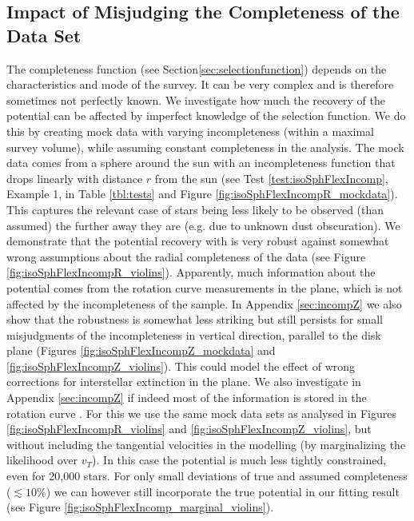 \subsection{Impact of Misjudging the Completeness of the Data Set} \label{sec:results_incompR}

The completeness function (see Section\ref{sec:selectionfunction}) depends on the characteristics and mode of the survey. It can be very complex and is therefore sometimes not perfectly known. We investigate how much the recovery of the potential can be affected by imperfect knowledge of the selection function. We do this by creating mock data with varying incompleteness (within a maximal survey volume), while assuming constant completeness in the analysis. The mock data comes from a sphere around the sun with an incompleteness function that drops linearly with distance $r$ from the sun (see Test \ref{test:isoSphFlexIncomp}, Example 1, in Table \ref{tbl:tests} and Figure \ref{fig:isoSphFlexIncompR_mockdata}). This captures the relevant case of stars being less likely to be observed (than assumed) the further away they are (e.g. due to unknown dust obscuration). We demonstrate that the potential recovery with \RM{} is very robust against somewhat wrong assumptions about the radial completeness of the data (see Figure \ref{fig:isoSphFlexIncompR_violins}). Apparently, much information about the potential comes from the rotation curve measurements in the plane, which is not affected by the incompleteness of the sample. In Appendix \ref{sec:incompZ} we also show that the robustness is somewhat less striking but still persists for small misjudgments of the incompleteness in vertical direction, parallel to the disk plane (Figures \ref{fig:isoSphFlexIncompZ_mockdata} and \ref{fig:isoSphFlexIncompZ_violins}). This could model the effect of wrong corrections for interstellar extinction in the plane. We also investigate in Appendix \ref{sec:incompZ} if indeed most of the information is stored in the rotation curve . For this we use the same mock data sets as analysed in Figures \ref{fig:isoSphFlexIncompR_violins} and \ref{fig:isoSphFlexIncompZ_violins}, but without including the tangential velocities in the modelling (by marginalizing the likelihood over $v_T$). In this case the potential is much less tightly constrained, even for 20,000 stars. For only small deviations of true and assumed completeness ($\lesssim 10\%$) we can however still incorporate the true potential in our fitting result (see Figure \ref{fig:isoSphFlexIncomp_marginal_violins}). 



